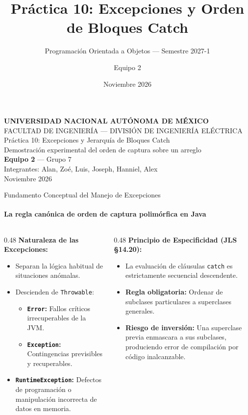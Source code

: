 \documentclass[aspectratio=169,11pt]{beamer}
\title{Práctica 10: Excepciones y Orden de Bloques Catch}
\subtitle{Programación Orientada a Objetos --- Semestre 2027-1}
\author{Equipo 2}
\institute{Facultad de Ingeniería \\ Universidad Nacional Autónoma de México}
\date{Noviembre 2026}
\begin{document}
\begin{frame}[plain]
  \vfill
  \centering
  {\small \textbf{UNIVERSIDAD NACIONAL AUTÓNOMA DE MÉXICO}}\\[0.2em]
  {\footnotesize FACULTAD DE INGENIERÍA --- DIVISIÓN DE INGENIERÍA ELÉCTRICA}\\[1.5em]
  { Práctica 10: Excepciones y Jerarquía de Bloques Catch}\\[0.4em]
  {\textcolor{fiGris}{Demostración experimental del orden de captura sobre un arreglo}}\\[1.5em]
  {\small \textbf{Equipo 2} --- Grupo 7}\\[0.2em]
  {\footnotesize Integrantes: Alan, Zoé, Luis, Joseph, Hanniel, Alex}\\[1em]
  {\footnotesize Noviembre 2026}
  \vfill
\end{frame}

\begin{frame}{Fundamento Conceptual del Manejo de Excepciones}
  \framesubtitle{La regla canónica de orden de captura polimórfica en Java}
  \begin{columns}[T]
    \begin{column}{0.48\textwidth}
      \textbf{Naturaleza de las Excepciones:}
      \small
      \begin{itemize}
        \item Separan la lógica habitual de situaciones anómalas.
        \item Descienden de \texttt{Throwable}:
          \begin{itemize}
            \item \textbf{\texttt{Error}:} Fallos críticos irrecuperables de la JVM.
            \item \textbf{\texttt{Exception}:} Contingencias previsibles y recuperables.
          \end{itemize}
        \item \textbf{\texttt{RuntimeException}:} Defectos de programación o manipulación incorrecta de datos en memoria.
      \end{itemize}
    \end{column}
    \begin{column}{0.48\textwidth}
      \textbf{Principio de Especificidad (JLS §14.20):}
      \small
      \begin{itemize}
        \item La evaluación de cláusulas \texttt{catch} es estrictamente secuencial descendente.
        \item \textbf{Regla obligatoria:} Ordenar de subclases particulares a superclases generales.
        \item \textbf{Riesgo de inversión:} Una superclase previa enmascara a sus subclases, produciendo error de compilación por código inalcanzable.
      \end{itemize}
    \end{column}
  \end{columns}
\end{frame}
\end{document}
